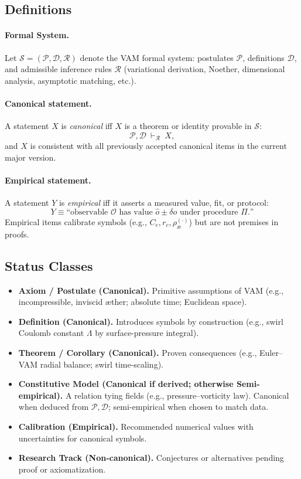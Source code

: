 \documentclass[11pt, a4paper]{article}
\begin{document}
    \subsection*{Definitions}
    \paragraph{Formal System.}
    Let \(\mathcal{S} = (\mathcal{P},\mathcal{D},\mathcal{R})\) denote the VAM formal system:
    postulates \(\mathcal{P}\), definitions \(\mathcal{D}\), and admissible inference rules \(\mathcal{R}\)
    (variational derivation, Noether, dimensional analysis, asymptotic matching, etc.).

    \paragraph{Canonical statement.}
    A statement \(X\) is \emph{canonical} iff \(X\) is a theorem or identity provable in \(\mathcal{S}\):
    \[
        \mathcal{P},\mathcal{D}\ \vdash_{\mathcal{R}}\ X,
    \]
    and \(X\) is consistent with all previously accepted canonical items in the current major version.

    \paragraph{Empirical statement.}
    A statement \(Y\) is \emph{empirical} iff it asserts a measured value, fit, or protocol:
    \[
        Y \equiv \text{“observable } \mathcal{O} \text{ has value } \hat{o} \pm \delta o \text{ under procedure } \Pi\text{.”}
    \]
    Empirical items calibrate symbols (e.g., \(C_e, r_c, \rho_{\text{\ae}}^{(\cdot)}\)) but are not premises in proofs.

    \subsection*{Status Classes}
    \begin{itemize}
        \item \textbf{Axiom / Postulate (Canonical).} Primitive assumptions of VAM (e.g., incompressible, inviscid æther; absolute time; Euclidean space).
        \item \textbf{Definition (Canonical).} Introduces symbols by construction (e.g., swirl Coulomb constant \(\Lambda\) by surface-pressure integral).
        \item \textbf{Theorem / Corollary (Canonical).} Proven consequences (e.g., Euler–VAM radial balance; swirl time-scaling).
        \item \textbf{Constitutive Model (Canonical if derived; otherwise Semi-empirical).} A relation tying fields (e.g., pressure–vorticity law). Canonical when deduced from \(\mathcal{P},\mathcal{D}\); semi-empirical when chosen to match data.
        \item \textbf{Calibration (Empirical).} Recommended numerical values with uncertainties for canonical symbols.
        \item \textbf{Research Track (Non-canonical).} Conjectures or alternatives pending proof or axiomatization.
    \end{itemize}
\end{document}
